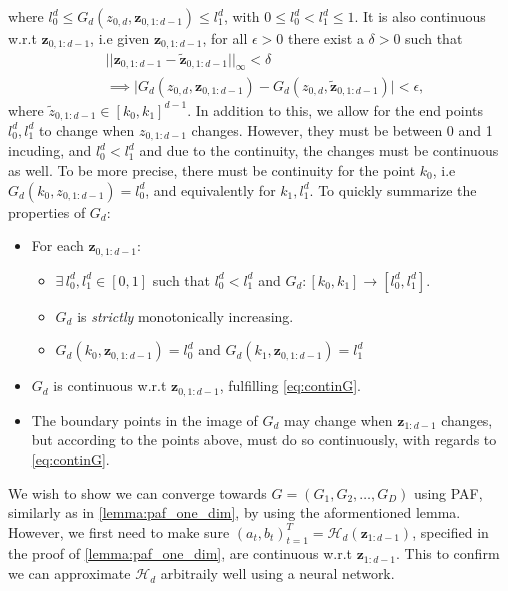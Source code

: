 where \(l_0^{d} \leq G_d(z_{0,d}, \bm z_{0,1:d-1}) \leq l^d_1\), with \(0 \leq l_0^d < l_1^d \leq 1\).
It is also continuous
w.r.t \(\bm z_{0,1:d-1}\), i.e given \(\bm z_{0,1:d-1}\), for all \(\epsilon > 0\) there exist a \(\delta > 0\) such that
\begin{align}\label{eq:continG}
    &\lvert\lvert \bm z_{0,1:d-1} - \tilde {\bm z}_{0,1:d-1} \rvert\rvert_{\infty} < \delta\\ &\implies 
    \lvert G_d(z_{0,d}, \bm z_{0,1:d-1}) - G_d(z_{0,d} ,\tilde{\bm z}_{0,1:d-1})\rvert < \epsilon,\nonumber
\end{align}
where \(\tilde z_{0,1:d-1} \in [k_0,k_1]^{d-1}\). In addition to this, we allow for the end points \(l_0^d, l_1^d\) to change when \(z_{0,1:d-1}\) changes.
However, they must be between 0 and 1 incuding, and \(l_0^d < l_1^d\) and due to the continuity, the changes must be continuous as well. 
To be more precise, there must be continuity for the point \(k_0\), i.e 
\(G_d(k_0, z_{0,1:d-1}) = l^d_0\), and equivalently for \(k_1, l_1^d\). To quickly summarize the properties of \(G_d\):
\begin{itemize}
    \item For each \(\bm z_{0,1:d-1}\): 
        \begin{itemize}
            \item \(\exists\, l_0^d, l_1^d \in [0,1]\) such that \(l_0^d < l_1^d\) and \(G_d\colon [k_0,k_1] \rightarrow [l_0^d, l_1^d]\).
            \item \(G_d\) is \emph{strictly} monotonically increasing.
            \item \(G_d(k_0, \bm z_{0,1:d-1}) = l_0^d\) and \(G_d(k_1,\bm z_{0,1:d-1}) = l_1^d\)
        \end{itemize}
    \item \(G_d\) is continuous w.r.t \(\bm z_{0,1:d-1}\), fulfilling \cref{eq:continG}.
    \item The boundary points in the image of \(G_d\) may change when \(\bm z_{1:d-1}\) changes, 
        but according to the points above, must do so continuously,
        with regards to \cref{eq:continG}.
\end{itemize}
We wish to show we can converge towards \(G = (G_1, G_2, \dots, G_D)\) using PAF, similarly as in \cref{lemma:paf_one_dim}, by
using the aformentioned lemma. However, we first need to make sure \((a_t,b_t)_{t=1}^T = \mathcal{H}_d(\bm z_{1:d-1})\), specified in the proof of
\cref{lemma:paf_one_dim}, are continuous w.r.t \(\bm z_{1:d-1}\). This to confirm we can approximate \(\mathcal{H}_d\) arbitraily well using a neural network.
